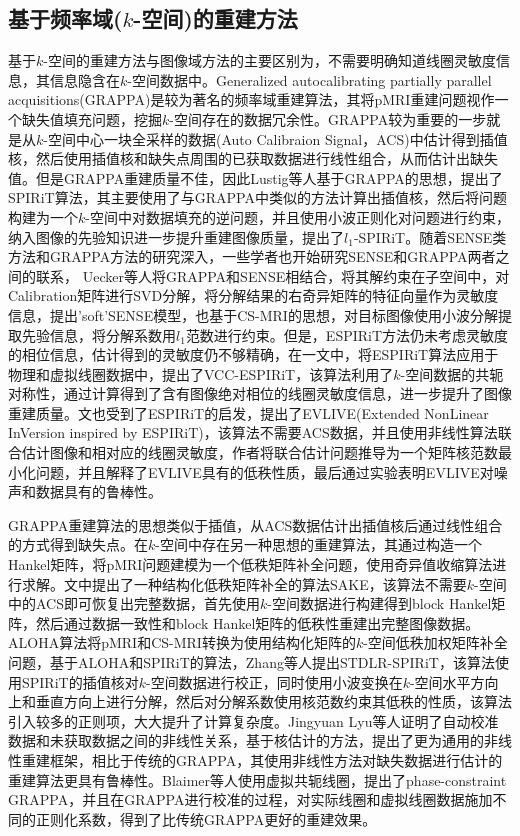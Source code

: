 \documentclass[UTF8]{article}
\begin{document}
\subsection{基于频率域($k$-空间)的重建方法}
\par 基于$k$-空间的重建方法与图像域方法的主要区别为，不需要明确知道线圈灵敏度信息，其信息隐含在$k$-空间数据中。Generalized autocalibrating partially parallel acquisitions(GRAPPA)\cite{griswold2002generalized}是较为著名的频率域重建算法，其将pMRI重建问题视作一个缺失值填充问题，挖掘$k$-空间存在的数据冗余性。GRAPPA较为重要的一步就是从$k$-空间中心一块全采样的数据(Auto Calibraion Signal，ACS)中估计得到插值核，然后使用插值核和缺失点周围的已获取数据进行线性组合，从而估计出缺失值。但是GRAPPA重建质量不佳，因此Lustig等人基于GRAPPA的思想，提出了SPIRiT\cite{lustig2010spirit}算法，其主要使用了与GRAPPA中类似的方法计算出插值核，然后将问题构建为一个$k$-空间中对数据填充的逆问题，并且使用小波正则化对问题进行约束，纳入图像的先验知识进一步提升重建图像质量，提出了$l_1$-SPIRiT。随着SENSE类方法和GRAPPA方法的研究深入，一些学者也开始研究SENSE和GRAPPA两者之间的联系， Uecker\cite{uecker2014espirit}等人将GRAPPA和SENSE相结合，将其解约束在子空间中，对Calibration矩阵进行SVD分解，将分解结果的右奇异矩阵的特征向量作为灵敏度信息，提出'soft'SENSE模型，也基于CS-MRI的思想，对目标图像使用小波分解提取先验信息，将分解系数用$l_1$范数进行约束。但是，ESPIRiT方法仍未考虑灵敏度的相位信息，估计得到的灵敏度仍不够精确，在\cite{uecker2017estimating}一文中，将ESPIRiT算法应用于物理和虚拟线圈数据中，提出了VCC-ESPIRiT，该算法利用了$k$-空间数据的共轭对称性，通过计算得到了含有图像绝对相位的线圈灵敏度信息，进一步提升了图像重建质量。文\cite{holme2019enlive}也受到了ESPIRiT的启发，提出了EVLIVE(Extended NonLinear InVersion inspired by ESPIRiT)，该算法不需要ACS数据，并且使用非线性算法联合估计图像和相对应的线圈灵敏度，作者将联合估计问题推导为一个矩阵核范数最小化问题，并且解释了EVLIVE具有的低秩性质，最后通过实验表明EVLIVE对噪声和数据具有的鲁棒性。
\par GRAPPA重建算法的思想类似于插值，从ACS数据估计出插值核后通过线性组合的方式得到缺失点。在$k$-空间中存在另一种思想的重建算法，其通过构造一个Hankel矩阵，将pMRI问题建模为一个低秩矩阵补全问题，使用奇异值收缩算法进行求解。文\cite{shin2014calibrationless}中提出了一种结构化低秩矩阵补全的算法SAKE，该算法不需要$k$-空间中的ACS即可恢复出完整数据，首先使用$k$-空间数据进行构建得到block Hankel矩阵，然后通过数据一致性和block Hankel矩阵的低秩性重建出完整图像数据。ALOHA\cite{7547372}算法将pMRI和CS-MRI转换为使用结构化矩阵的$k$-空间低秩加权矩阵补全问题，基于ALOHA和SPIRiT的算法，Zhang等人提出STDLR-SPIRiT，该算法使用SPIRiT的插值核对$k$-空间数据进行校正，同时使用小波变换在$k$-空间水平方向上和垂直方向上进行分解，然后对分解系数使用核范数约束其低秩的性质，该算法引入较多的正则项，大大提升了计算复杂度。Jingyuan Lyu\cite{8428648}等人证明了自动校准数据和未获取数据之间的非线性关系，基于核估计的方法，提出了更为通用的非线性重建框架，相比于传统的GRAPPA，其使用非线性方法对缺失数据进行估计的重建算法更具有鲁棒性。Blaimer\cite{blaimer2014regularization}等人使用虚拟共轭线圈，提出了phase-constraint GRAPPA，并且在GRAPPA进行校准的过程，对实际线圈和虚拟线圈数据施加不同的正则化系数，得到了比传统GRAPPA更好的重建效果。
\end{document}
